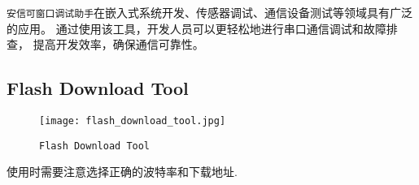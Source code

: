\documentclass[../main.tex]{subfiles}
\begin{document}
\texttt{安信可窗口调试助手}在嵌入式系统开发、传感器调试、通信设备测试等领域具有广泛的应用。
通过使用该工具，开发人员可以更轻松地进行串口通信调试和故障排查，
提高开发效率，确保通信可靠性。
%
\subsection{Flash Download Tool}
\begin{figure}[H]
  \begin{center}
    \texttt{[image: flash\_download\_tool.jpg]}
  \end{center}
  \caption{\texttt{Flash Download Tool}}
\end{figure}
%
使用时需要注意选择正确的波特率和下载地址.
%
\end{document}

